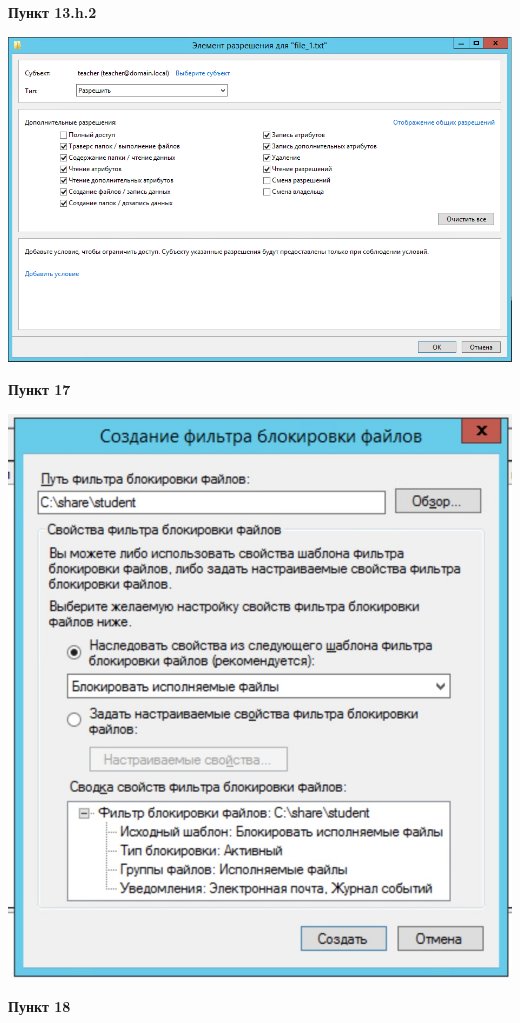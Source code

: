 \documentclass[a4paper,14pt]{extarticle}
\begin{document}
    \textbf{Пункт 13.h.2}
    \begin{center}
        \includegraphics[scale=0.7]{13.h.2}
    \end{center}
    \newpage
    \textbf{Пункт 17}
    \begin{center}
        \includegraphics[scale=0.4]{17.jpg}
    \end{center}
    \newpage
    \textbf{Пункт 18}
\end{document}
